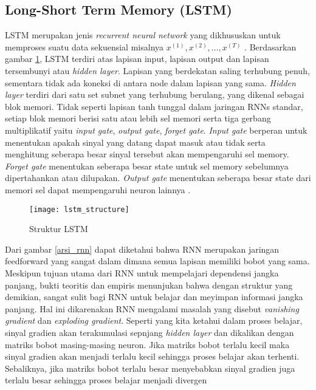 \documentclass[../thesis.tex]{subfiles}
\begin{document}
\subsection{Long-Short Term Memory (LSTM)}
LSTM merupakan jenis \textit{recurrent neural network} yang dikhususkan untuk memproses suatu data sekuensial misalnya $x^{(1)}, x^{(2)}, ...,x^{(T)}$ \cite{LSTM_2}. 
Berdasarkan gambar \ref{arsi_lstm}, LSTM terdiri atas lapisan input, lapisan output dan lapisan tersembunyi atau \textit{hidden layer}. Lapisan yang berdekatan saling terhubung penuh, sementara tidak ada koneksi di antara node dalam lapisan yang sama.
\textit{Hidden layer} terdiri dari satu set subnet yang terhubung berulang, yang dikenal sebagai blok memori. Tidak seperti lapisan tanh tunggal dalam jaringan RNNs standar, setiap blok memori berisi satu atau lebih sel memori serta tiga gerbang multiplikatif
yaitu \textit{input gate}, \textit{output gate}, \textit{forget gate}. \textit{Input gate} berperan untuk menentukan apakah sinyal yang datang dapat masuk atau tidak serta menghitung seberapa besar sinyal tersebut akan mempengaruhi sel memory.
\textit{Forget gate} menentukan seberapa besar state untuk sel memory sebelumnya dipertahankan atau dilupakan. \textit{Output gate} menentukan seberapa besar state dari memori sel dapat mempengaruhi neuron lainnya \cite{LSTM_1}.

\begin{figure}
	\centering
	\texttt{[image: lstm\_structure]}
	\caption{Struktur LSTM}
	\label{arsi_lstm}
\end{figure}

Dari gambar \ref{arsi_rnn} dapat diketahui bahwa RNN merupakan jaringan feedforward yang sangat dalam dimana semua lapisan memiliki bobot yang sama. Meskipun tujuan utama dari RNN untuk mempelajari dependensi 
jangka panjang, bukti teoritis dan empiris menunjukan bahwa dengan struktur yang demikian, sangat sulit bagi RNN untuk belajar dan meyimpan informasi jangka panjang. Hal ini dikarenakan RNN mengalami masalah yang disebut 
\textit{vanishing gradient} dan \textit{exploding gradient}. Seperti yang kita ketahui dalam proses belajar, sinyal gradien akan terakumulasi sepnjang \textit{hidden layer} dan dikalikan dengan matriks bobot masing-masing neuron.
Jika matriks bobot terlalu kecil maka sinyal gradien akan menjadi terlalu kecil sehingga proses belajar akan terhenti. Sebaliknya, jika matriks bobot terlalu besar menyebabkan sinyal gradien juga terlalu besar sehingga proses belajar menjadi divergen \cite{LSTM_2}
\end{document}
